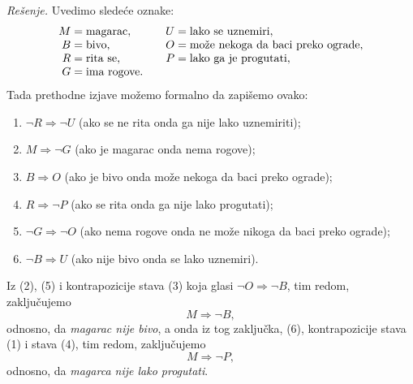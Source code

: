 \noindent
\textit{Re\v senje.}
Uvedimo slede\'ce oznake:
$$
  \begin{array}{r@{\;=\;}l@{\qquad}r@{\;=\;}l}
  M & \text{magarac},    & U & \text{lako se uznemiri},\\
  B & \text{bivo},       & O & \text{mo\v ze nekoga da baci preko ograde},\\
  R & \text{rita se},    & P & \text{lako ga je progutati},\\
  G & \text{ima rogove}.
  \end{array}
$$
Tada prethodne izjave mo\v zemo formalno da zapi\v semo ovako:
\begin{enumerate}
\item%
  $\lnot R \Rightarrow \lnot U$
  (ako se ne rita onda ga nije lako uznemiriti);
\item%
  $M \Rightarrow \lnot G$
  (ako je magarac onda nema rogove);
\item%
  $B \Rightarrow O$
  (ako je bivo onda mo\v ze nekoga da baci preko ograde);
\item%
  $R \Rightarrow \lnot P$
  (ako se rita onda ga nije lako progutati);
\item%
  $\lnot G \Rightarrow \lnot O$
  (ako nema rogove onda ne mo\v ze nikoga da baci preko ograde);
\item%
  $\lnot B \Rightarrow U$
  (ako nije bivo onda se lako uznemiri).
\end{enumerate}
Iz (2), (5) i kontrapozicije stava (3) koja glasi $\lnot O \Rightarrow \lnot B$, tim redom, zaklju\v cujemo
$$
  M \Rightarrow \lnot B,
$$
odnosno, da \emph{magarac nije bivo}, a onda iz tog zaklju\v cka, (6), kontrapozicije stava (1) i stava (4), tim redom,
zaklju\v cujemo
$$
  M \Rightarrow \lnot P,
$$
odnosno, da \emph{magarca nije lako progutati}.

